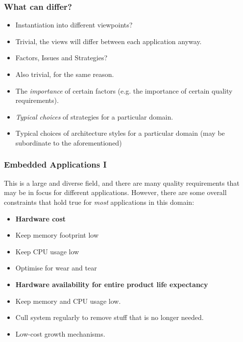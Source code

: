 \documentclass[10pt]{beamer}
\def\subitem{\item[\hspace{1.5cm} -]}
\begin{document}
\begin{frame}[t]
\frametitle{What can differ?}
\begin{itemize}[<+->]
\item Instantiation into different viewpoints?
\subitem Trivial, the views will differ between each application anyway.
\item Factors, Issues and Strategies?
\subitem Also trivial, for the same reason.
\item The \emph{importance} of certain factors (e.g. the importance of certain quality requirements).
\item \emph{Typical choices} of strategies for a particular domain.
\item Typical choices of architecture styles for a particular domain (may be subordinate to the aforementioned)
\end{itemize}
\end{frame}

\begin{frame}[t]
\frametitle{Embedded Applications I}
This is a large and diverse field, and there are many quality requirements that may be in focus for different applications. However, there are some overall constraints that hold true for \emph{most} applications in this domain:
\begin{itemize}
\item {\bf Hardware cost} %
\subitem Keep memory footprint low
\subitem Keep CPU usage low
\subitem Optimise for wear and tear
\item {\bf Hardware availability for entire product life expectancy} %
\subitem Keep memory and CPU usage low.
\subitem Cull system regularly to remove stuff that is no longer needed.
\subitem Low-cost growth mechanisms.
\end{itemize}
\end{frame}
\end{document}
